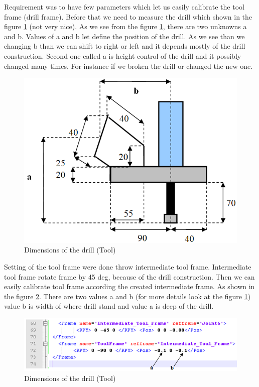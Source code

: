 Requirement was to have few parameters which let us easily calibrate the tool frame (drill frame). Before that we need to measure the drill which shown in the figure \ref{fig:drillDimensions} (not very nice). As we see from the figure \ref{fig:drillDimensions}, there are two unknowns a and b. Values of a and b let define the position of the drill. As we see than we changing b than we can shift to right or left and it depends mostly of the drill construction. Second one called a is height control of the drill and it possibly changed many times. For instance if we broken the drill or changed the new one. 

\begin{figure}[H]
  \centering
  \includegraphics[scale= 0.6]{source/drillDimensions.png}
  \caption{Dimensions of the drill (Tool)}
  \label{fig:drillDimensions}
\end{figure}

Setting of the tool frame were done throw intermediate tool frame. Intermediate tool frame rotate frame by 45 deg, because of the drill construction.  Then we can easily calibrate tool frame according the created intermediate frame. As shown in the figure \ref{fig:toolCalibrationXML}. There are two values a and b (for more details look at the figure \ref{fig:drillDimensions}) value b is width of where drill stand and value a is deep of the drill.

\begin{figure}[H]
  \centering
  \includegraphics[scale= 0.6]{source/toolCalibrationXML.png}
  \caption{Dimensions of the drill (Tool)}
  \label{fig:toolCalibrationXML}
\end{figure}

